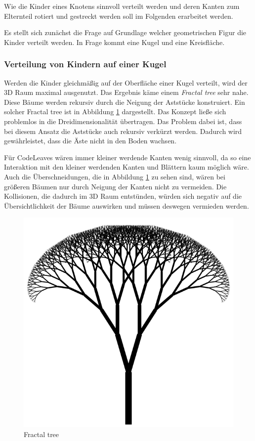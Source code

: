 Wie die Kinder eines Knotens sinnvoll verteilt werden und deren Kanten zum Elternteil rotiert und gestreckt werden soll im Folgenden erarbeitet werden.

Es stellt sich zunächst die Frage auf Grundlage welcher geometrischen Figur die Kinder verteilt werden. In Frage kommt eine Kugel und eine Kreisfläche.

\subsubsection*{Verteilung von Kindern auf einer Kugel}
Werden die Kinder gleichmäßig auf der Oberfläche einer Kugel verteilt, wird der 3D Raum maximal ausgenutzt. Das Ergebnis käme einem \textit{Fractal tree} sehr nahe. Diese Bäume werden rekursiv durch die Neigung der Aststücke konstruiert. Ein solcher Fractal tree ist in Abbildung \ref{fig:fractal-tree} dargestellt. Das Konzept ließe sich problemlos in die Dreidimensionalität übertragen. Das Problem dabei ist, dass bei diesem Ansatz die Aststücke auch rekursiv verkürzt werden. Dadurch wird gewährleistet, dass die Äste nicht in den Boden wachsen.

Für CodeLeaves wären immer kleiner werdende Kanten wenig sinnvoll, da so eine Interaktion mit den kleiner werdenden Kanten und Blättern kaum möglich wäre. Auch die Überschneidungen, die in Abbildung \ref{fig:fractal-tree} zu sehen sind, wären bei größeren Bäumen nur durch Neigung der Kanten nicht zu vermeiden. Die Kollisionen, die dadurch im 3D Raum entstünden, würden sich negativ auf die Übersichtlichkeit der Bäume auswirken und müssen deswegen vermieden werden.

\begin{figure}[htb]
  \includegraphics[width=.5\textwidth]{figures/fractal-tree}
  \caption{Fractal tree \cite{rocchini2017fractal}}
  \label{fig:fractal-tree}
\end{figure}

